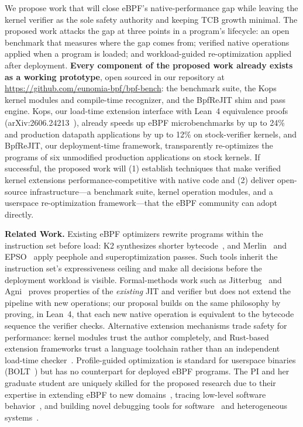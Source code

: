 We propose work that will close eBPF's native-performance gap while leaving the kernel verifier as the sole safety authority and keeping TCB growth minimal.  The proposed work attacks the gap at three points in a program's lifecycle: an open benchmark that measures where the gap comes from; verified native operations applied when a program is loaded; and workload-guided re-optimization applied after deployment.  \textbf{Every component of the proposed work already exists as a working prototype}, open sourced in our repository at \url{https://github.com/eunomia-bpf/bpf-bench}: the benchmark suite, the Kops kernel modules and compile-time recognizer, and the BpfReJIT shim and pass engine.  Kops, our load-time extension interface with Lean~4 equivalence proofs (arXiv:2606.24213~\cite{zheng2026kops}), already speeds up eBPF microbenchmarks by up to 24\% and production datapath applications by up to 12\% on stock-verifier kernels, and BpfReJIT, our deployment-time framework, transparently re-optimizes the programs of six unmodified production applications on stock kernels.  If successful, the proposed work will (1) establish techniques that make verified kernel extensions performance-competitive with native code and (2) deliver open-source infrastructure---a benchmark suite, kernel operation modules, and a userspace re-optimization framework---that the eBPF community can adopt directly.

\noindent \textbf{Related Work.}
Existing eBPF optimizers rewrite programs within the instruction set before load: K2 synthesizes shorter bytecode~\cite{xu2021synthesizing}, and Merlin~\cite{mao2024merlin} and EPSO~\cite{zhu2025epso} apply peephole and superoptimization passes.  Such tools inherit the instruction set's expressiveness ceiling and make all decisions before the deployment workload is visible.  Formal-methods work such as Jitterbug~\cite{nelson2020specification} and Agni~\cite{vishwanathan2023verifying} proves properties of the \textit{existing} JIT and verifier but does not extend the pipeline with new operations; our proposal builds on the same philosophy by proving, in Lean~4, that each new native operation is equivalent to the bytecode sequence the verifier checks.  Alternative extension mechanisms trade safety for performance: kernel modules trust the author completely, and Rust-based extension frameworks trust a language toolchain rather than an independent load-time checker~\cite{jia2025rex}.  Profile-guided optimization is standard for userspace binaries (\eg BOLT~\cite{panchenko2019bolt}) but has no counterpart for deployed eBPF programs.  The PI and her graduate student are uniquely skilled for the proposed research due to their expertise in extending eBPF to new domains~\cite{zheng2025extending,yang2025egpu}, tracing low-level software behavior~\cite{Quinn_2018_sledgehammer}, and building novel debugging tools for software~\cite{Quinn_2022_omnitable} and heterogeneous systems~\cite{Ma_2022_bnw}.

